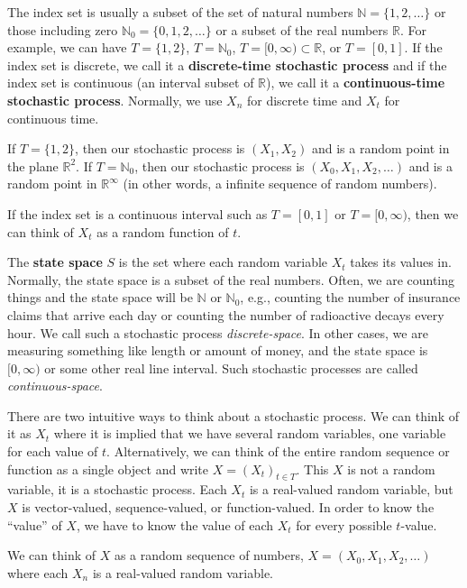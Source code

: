 \documentclass[
]{article}
\begin{document}
The index set is usually a subset of the set of natural numbers
\(\mathbb N=\{1,2,\ldots\}\) or those including zero
\(\mathbb N_0=\{0,1,2,\ldots\}\) or a subset of the real numbers
\(\mathbb R\). For example, we can have \(T=\{1,2\}\), \(T=\mathbb N_0\),
\(T=[0,\infty)\subset\mathbb R\), or \(T=[0,1]\). If the index set is
discrete, we call it a \textbf{discrete-time stochastic process} and if the
index set is continuous (an interval subset of \(\mathbb R\)), we call it
a \textbf{continuous-time stochastic process}. Normally, we use \(X_n\) for
discrete time and \(X_t\) for continuous time.

If \(T=\{1,2\}\), then our stochastic process is \((X_1,X_2)\) and is a
random point in the plane \(\mathbb R^2\). If \(T=\mathbb N_0\), then our
stochastic process is \((X_0, X_1,X_2,\ldots)\) and is a random point in
\(\mathbb R^\infty\) (in other words, a infinite sequence of random
numbers).

If the index set is a continuous interval such as \(T=[0,1]\) or
\(T=[0,\infty)\), then we can think of \(X_t\) as a random function of \(t\).

The \textbf{state space} \(S\) is the set where each random variable \(X_t\)
takes its values in. Normally, the state space is a subset of the real
numbers. Often, we are counting things and the state space will be
\(\mathbb N\) or \(\mathbb N_0\), e.g., counting the number of insurance
claims that arrive each day or counting the number of radioactive decays
every hour. We call such a stochastic process \emph{discrete-space}. In other
cases, we are measuring something like length or amount of money, and
the state space is \([0,\infty)\) or some other real line interval. Such
stochastic processes are called \emph{continuous-space}.

There are two intuitive ways to think about a stochastic process. We can
think of it as \(X_t\) where it is implied that we have several random
variables, one variable for each value of \(t\). Alternatively, we can
think of the entire random sequence or function as a single object and
write \(X=(X_t)_{t\in T}\). This \(X\) is not a random variable, it is a
stochastic process. Each \(X_t\) is a real-valued random variable, but \(X\)
is vector-valued, sequence-valued, or function-valued. In order to know
the ``value'' of \(X\), we have to know the value of each \(X_t\) for every
possible \(t\)-value.

We can think of \(X\) as a random sequence of numbers,
\(X=(X_0,X_1,X_2,\ldots)\) where each \(X_n\) is a real-valued random
variable.
\end{document}
